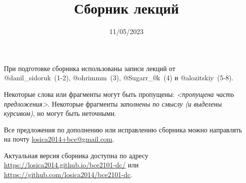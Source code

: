 

\title{Сборник лекций}
\date{11/05/2023}
\author{}
\email{}

\def \missed{\textit{<пропущена часть предложения>}}

\usepackage{multienum}
\newtheorem{definition}{Определение}



\maketitle

При подготовке сборника использованы записи лекций от\\@danil\_sidoruk~(1-2), @ohrimmm~(3), @Sugarr\_0k~(4) и @alozitskiy~(5-8).

Некоторые слова или фрагменты могут быть пропущены: \missed{}.
Некоторые фрагменты \textit{заполнены по смыслу (и выделены курсивом)}, но могут быть неточными.

Все предложения по дополнению или исправлению сборника можно направлять на почту \href{mailto:losica2014+bce@gmail.com?subject=%D0%94%D0%BE%D0%BF%D0%BE%D0%BB%D0%BD%D0%B5%D0%BD%D0%B8%D0%B5%20%D0%BA%20%D1%81%D0%B1%D0%BE%D1%80%D0%BD%D0%B8%D0%BA%D1%83%20%D0%BB%D0%B5%D0%BA%D1%86%D0%B8%D0%B9%20(%D0%AD%D0%94%D0%9E)&body=%D0%9E%D0%BF%D0%B8%D1%88%D0%B8%D1%82%D0%B5%20%D0%B7%D0%B4%D0%B5%D1%81%D1%8C%2C%20%D1%87%D1%82%D0%BE%20%D0%B2%D1%8B%20%D1%85%D0%BE%D1%82%D0%B8%D1%82%D0%B5%20%D0%B4%D0%BE%D0%BF%D0%BE%D0%BB%D0%BD%D0%B8%D1%82%D1%8C%20%D0%B8%D0%BB%D0%B8%20%D0%B8%D1%81%D0%BF%D1%80%D0%B0%D0%B2%D0%B8%D1%82%D1%8C.%20%D0%A3%D0%BA%D0%B0%D0%B6%D0%B8%D1%82%D0%B5%20%D1%82%D0%B5%D0%BC%D1%83%2C%20%D0%BC%D0%B5%D1%81%D1%82%D0%BE%20(%D0%BD%D0%BE%D0%BC%D0%B5%D1%80%20%D1%80%D0%B0%D0%B7%D0%B4%D0%B5%D0%BB%D0%B0)%20%D0%B8%20%D0%B2%D0%B0%D1%88%D0%B5%20%D0%B8%D1%81%D0%BF%D1%80%D0%B0%D0%B2%D0%BB%D0%B5%D0%BD%D0%B8%D0%B5.%20%D0%9F%D0%BE%20%D0%B2%D0%BE%D0%B7%D0%BC%D0%BE%D0%B6%D0%BD%D0%BE%D1%81%D1%82%D0%B8%20%D0%BF%D1%80%D0%BE%D0%BA%D0%BE%D0%BC%D0%BC%D0%B5%D0%BD%D1%82%D0%B8%D1%80%D1%83%D0%B9%D1%82%D0%B5%2C%20%D0%BF%D0%BE%D1%87%D0%B5%D0%BC%D1%83%20%D0%B2%D1%8B%20%D1%85%D0%BE%D1%82%D0%B8%D1%82%D0%B5%20%D1%82%D0%B0%D0%BA%20%D1%81%D0%B4%D0%B5%D0%BB%D0%B0%D1%82%D1%8C.}{losica2014+bce@gmail.com}.

Актуальная версия сборника доступна по адресу \url{https://losica2014.github.io/bce2101-dc/} или \url{https://github.com/losica2014/bce2101-dc}.

